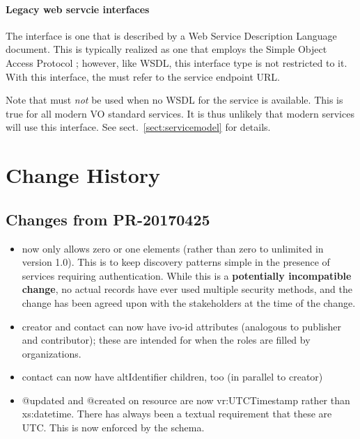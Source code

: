 \documentclass[11pt,a4paper]{ivoa}
\begin{document}

\paragraph{Legacy web servcie interfaces}

The  interface is one that is described by a Web
Service Description Language \citep{booth07} document. This is typically
realized as one that employs the Simple Object Access Protocol
\citep{std:SOAP}; however, like WSDL, this interface type is not
restricted to it. With this interface, the  must
refer to the service endpoint URL.

Note that  must \emph{not} be used when no WSDL for
the service is available.  This is true for all modern VO standard
services.  It is thus unlikely that modern services will use this
interface.  See sect.~\ref{sect:servicemodel} for details.

\appendix

\section{Change History}

\subsection{Changes from PR-20170425}

\begin{itemize} 
\item {} now only allows zero or one
 elements (rather than zero to unlimited in
version 1.0).  This is to keep discovery patterns simple in the presence
of services requiring authentication.  While this is a
\textbf{potentially incompatible change}, no actual records have ever
used multiple security methods, and the change has been agreed upon with
the stakeholders at the time of the change.
\item creator and contact can now have ivo-id attributes (analogous
to publisher and contributor); these are intended for when the roles are
filled by organizations.
\item contact can now have altIdentifier children, too (in parallel to
creator)
\item @updated and @created on resource are now vr:UTCTimestamp rather
than xs:datetime.  There has always been a textual requirement that
these are UTC.  This is now enforced by the schema.
\end{itemize}
\end{document}
